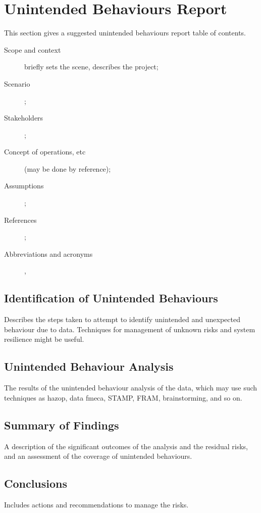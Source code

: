%
%
\chapter{Unintended Behaviours Report} \label{bkm:unintended}

This section gives a suggested unintended behaviours report table of contents.
\begin{description}
	\item[Scope and context] briefly sets the scene, describes the project;
	\item[Scenario];
	\item[Stakeholders];
	\item[Concept of operations, etc] (may be done by reference); \item[Assumptions];
	\item[References];
	\item[Abbreviations and acronyms],
\end{description}
\section{Identification of Unintended Behaviours}
Describes the steps taken to attempt to identify unintended and unexpected behaviour due to data. Techniques for management of unknown risks and system resilience might be useful.
\section{Unintended Behaviour Analysis}
The results of the unintended behaviour analysis of the data, which may use such techniques as \gls{hazop}, data \gls{fmeca}, STAMP, FRAM, brainstorming, and so on.
\section{Summary of Findings}
A description of the significant outcomes of the analysis and the residual risks, and an assessment of the coverage of unintended behaviours.
\section{Conclusions}
Includes actions and recommendations to manage the risks.
